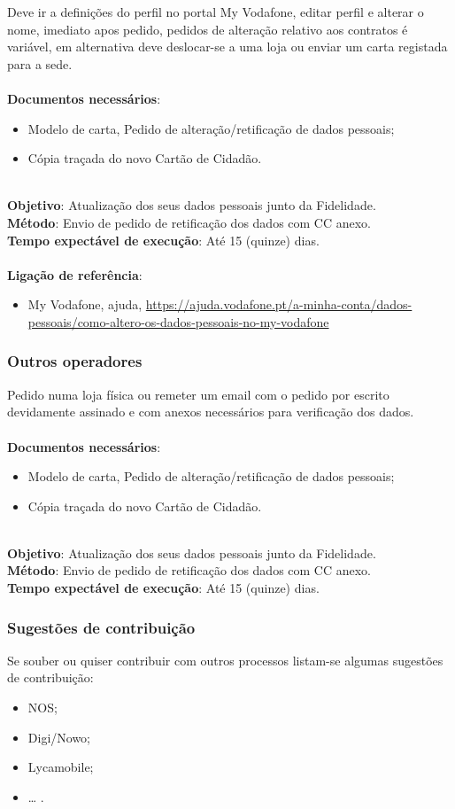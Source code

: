 Deve ir a definições do perfil no portal My Vodafone, editar perfil e
alterar o nome, imediato apos pedido, pedidos de alteração relativo aos
contratos é variável, em alternativa deve deslocar-se a uma loja ou
enviar um carta registada para a sede. \\
\\
\textbf{Documentos necessários}:
\begin{itemize}
	\item Modelo de carta, Pedido de alteração/retificação de dados pessoais;
	\item Cópia traçada do novo Cartão de Cidadão.
\end{itemize}
\leavevmode\\
\textbf{Objetivo}: Atualização dos seus dados pessoais junto da Fidelidade. \\
\textbf{Método}: Envio de pedido de retificação dos dados com CC anexo. \\
\textbf{Tempo expectável de execução}: Até 15 (quinze) dias. \\
\\
\textbf{Ligação de referência}:
\begin{itemize}
	\item My Vodafone, ajuda, \url{https://ajuda.vodafone.pt/a-minha-conta/dados-pessoais/como-altero-os-dados-pessoais-no-my-vodafone}
\end{itemize}

\subsubsection{Outros operadores}

Pedido numa loja física ou remeter um email com o pedido por escrito
devidamente assinado e com anexos necessários para verificação dos
dados. \\
\\
\textbf{Documentos necessários}:
\begin{itemize}
	\item Modelo de carta, Pedido de alteração/retificação de dados pessoais;
	\item Cópia traçada do novo Cartão de Cidadão.
\end{itemize}
\leavevmode\\
\textbf{Objetivo}: Atualização dos seus dados pessoais junto da Fidelidade. \\
\textbf{Método}: Envio de pedido de retificação dos dados com CC anexo. \\
\textbf{Tempo expectável de execução}: Até 15 (quinze) dias.

\subsubsection{Sugestões de contribuição}

Se souber ou quiser contribuir com outros processos listam-se algumas
sugestões de contribuição:
\begin{itemize}
	\item NOS;
	\item Digi/Nowo;
	\item Lycamobile;
	\item \ldots{} .
\end{itemize}